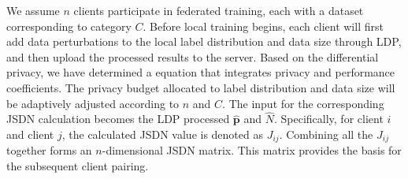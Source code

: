 \documentclass[journal,twoside,web]{ieeecolor}
\begin{document}
We assume $n$ clients participate in federated training, each with a dataset corresponding to category $C$. Before local training begins, each client will first add data perturbations to the local label distribution and data size through LDP, and then upload the processed results to the server. Based on the differential privacy, we have determined a equation that integrates privacy and performance coefficients. The privacy budget allocated to label distribution and data size will be adaptively adjusted according to $n$ and $C$. The input for the corresponding JSDN calculation becomes the LDP processed $\hat{\mathbf{p}}$ and  $\hat{N}$. Specifically, for client $i$ and client $j$, the calculated JSDN value is denoted as \(J_{ij}\). Combining all the \(J_{ij}\) together forms an $n$-dimensional JSDN matrix. This matrix provides the basis for the subsequent client pairing.






    

    
\end{document}
